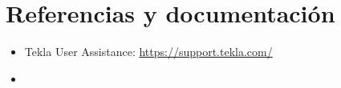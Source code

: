 \documentclass[11pt,a4paper]{article}
\begin{document}
\begin{advertencia}
\end{advertencia}

\section{Referencias y documentación}
\begin{itemize}
    \item Tekla User Assistance: \url{https://support.tekla.com/}
    \item [Otras referencias]
\end{itemize}
\end{document}
